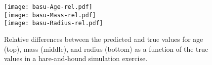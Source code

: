 \documentclass[manuscript,linenumbers]{aastex6}
\newcommand{\colwidth}{0.5\textwidth}
\begin{document}
\begin{figure}
    \centering
    \texttt{[image: basu-Age-rel.pdf]}\\
    \texttt{[image: basu-Mass-rel.pdf]}\\
    \texttt{[image: basu-Radius-rel.pdf]}
    \caption{Relative differences between the predicted and true values for age (top), mass (middle), and radius (bottom) as a function of the true values in a hare-and-hound simulation exercise. \vspace*{5mm} %
    \label{fig:hare-comparison}}
\end{figure}


\end{document}
